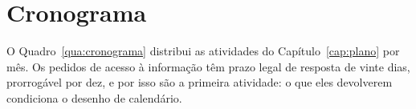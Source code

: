 
\chapter{Cronograma}
\label{cap:cronograma}

O Quadro~\ref{qua:cronograma} distribui as atividades do
Capítulo~\ref{cap:plano} por mês.  Os pedidos de acesso à informação têm prazo
legal de resposta de vinte dias, prorrogável por dez, e por isso são a primeira
atividade: o que eles devolverem condiciona o desenho de calendário.

